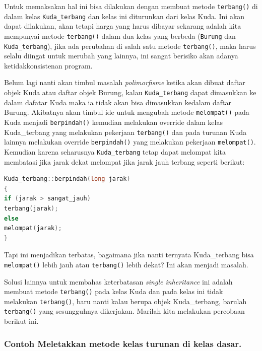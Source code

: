 Untuk memaksakan hal ini bisa dilakukan dengan membuat metode
\texttt{terbang()} di dalam kelas \texttt{Kuda\_terbang} dan kelas ini
diturunkan dari kelas Kuda. Ini akan dapat dilakukan, akan tetapi harga
yang harus dibayar sekarang adalah kita mempunyai metode
\texttt{terbang()} dalam dua kelas yang berbeda (\texttt{Burung} dan
\texttt{Kuda\_terbang}), jika ada perubahan di salah satu metode
\texttt{terbang()}, maka harus selalu diingat untuk merubah yang
lainnya, ini sangat berisiko akan adanya ketidakkonsistenan program.

Belum lagi nanti akan timbul masalah \emph{polimorfisme} ketika akan
dibuat daftar objek Kuda atau daftar objek Burung, kalau
\texttt{Kuda\_terbang} dapat dimasukkan ke dalam dafatar Kuda maka ia
tidak akan bisa dimasukkan kedalam daftar Burung. Akibatnya akan timbul
ide untuk mengubah metode \texttt{melompat()} pada Kuda menjadi
\texttt{berpindah()} kemudian melakukan override dalam kelas
Kuda\_terbang yang melakukan pekerjaan \texttt{terbang()} dan pada
turunan Kuda lainnya melakukan override \texttt{berpindah()} yang
melakukan pekerjaan \texttt{melompat()}. Kemudian karena seharusnya
\texttt{Kuda\_terbang} tetap dapat melompat kita membatasi jika jarak
dekat melompat jika jarak jauh terbang seperti berikut:

\begin{lstlisting}[language=c++, numbers=none]
Kuda_terbang::berpindah(long jarak)
{
if (jarak > sangat_jauh)
terbang(jarak);
else
melompat(jarak);
}
\end{lstlisting}

Tapi ini menjadikan terbatas, bagaimana jika nanti ternyata
Kuda\_terbang bisa \texttt{melompat()} lebih jauh atau
\texttt{terbang()} lebih dekat? Ini akan menjadi masalah.

Solusi lainnya untuk membahas keterbatasan \emph{single inheritance} ini
adalah membuat metode \texttt{terbang()} pada kelas Kuda dan pada kelas
ini tidak melakukan \texttt{terbang()}, baru nanti kalau berupa objek
Kuda\_terbang, barulah \texttt{terbang()} yang sesungguhnya dikerjakan.
Marilah kita melakukan percobaan berikut ini.

\subsubsection*{Contoh  Meletakkan metode kelas turunan di kelas dasar.}

